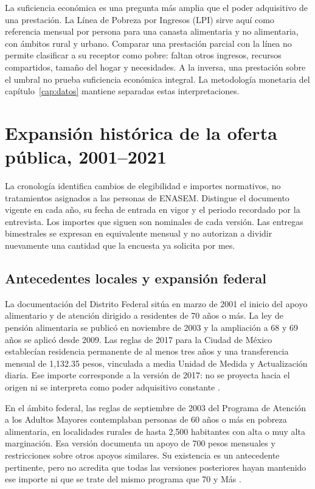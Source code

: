 La suficiencia económica es una pregunta más amplia que el poder adquisitivo
de una prestación. La Línea de Pobreza por Ingresos (LPI) sirve aquí como referencia mensual por persona
para una canasta alimentaria y no alimentaria, con ámbitos rural y urbano.
Comparar una prestación parcial con la línea no permite clasificar a su
receptor como pobre: faltan otros ingresos, recursos compartidos, tamaño del
hogar y necesidades. A la inversa, una prestación sobre el umbral no prueba
suficiencia económica integral. La metodología monetaria del
capítulo~\ref{cap:datos} mantiene separadas estas interpretaciones.

\section{Expansión histórica de la oferta pública, 2001--2021}
\label{sec:cronologia-politicas}

La cronología identifica cambios de elegibilidad e importes normativos,
no tratamientos asignados a las personas de ENASEM. Distingue el documento
vigente en cada año, su fecha de entrada en vigor y el periodo recordado por
la entrevista. Los importes que siguen son nominales de cada versión.
Las entregas bimestrales se expresan en equivalente mensual y no autorizan
a dividir nuevamente una cantidad que la encuesta ya solicita por mes.

\subsection{Antecedentes locales y expansión federal}

La documentación del Distrito Federal sitúa en marzo de 2001 el inicio del
apoyo alimentario y de atención dirigido a residentes de 70 años o más.
La ley de pensión alimentaria se publicó en noviembre de 2003 y la ampliación
a 68 y 69 años se aplicó desde 2009. Las reglas de 2017 para la Ciudad de México
establecían residencia permanente de al menos tres años y una transferencia
mensual de 1,132.35 pesos, vinculada a media Unidad de Medida y Actualización
diaria. Ese importe corresponde a la versión de 2017: no se proyecta hacia
el origen ni se interpreta como poder adquisitivo constante
\citep{evalua2015,cdmx2017}.

En el ámbito federal, las reglas de septiembre de 2003 del Programa de Atención
a los Adultos Mayores contemplaban personas de 60 años o más en pobreza
alimentaria, en localidades rurales de hasta 2,500 habitantes con alta o muy alta
marginación. Esa versión documenta un apoyo de 700 pesos mensuales y restricciones
sobre otros apoyos similares. Su existencia es un antecedente pertinente, pero
no acredita que todas las versiones posteriores hayan mantenido ese importe
ni que se trate del mismo programa que 70 y Más \citep{rural2003}.

